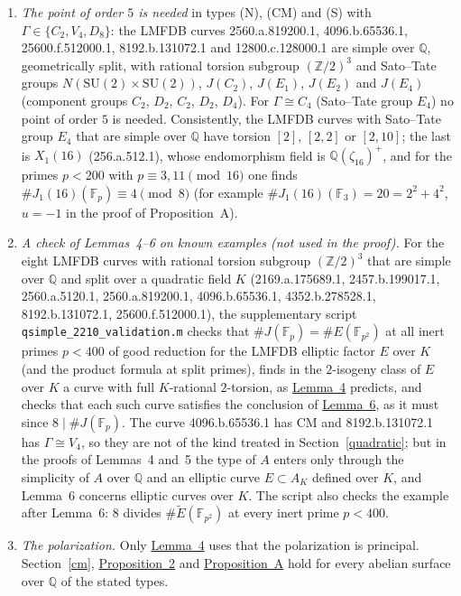 \documentclass[11pt]{article}
\newcommand{\Q}{\mathbb Q}
\newcommand{\Z}{\mathbb Z}
\newcommand{\F}{\mathbb F}
\begin{document}
\begin{enumerate}
\item \emph{The point of order \(5\) is needed} in types (N), (CM) and (S) with
\(\Gamma\in\{C_2,V_4,D_8\}\): the LMFDB curves 2560.a.819200.1, 4096.b.65536.1, 25600.f.512000.1,
8192.b.131072.1 and 12800.c.128000.1 are simple over \(\Q\), geometrically split, with rational
torsion subgroup \((\Z/2)^3\) and Sato--Tate groups \(N(\mathrm{SU}(2)\times\mathrm{SU}(2))\),
\(J(C_2)\), \(J(E_1)\), \(J(E_2)\) and \(J(E_4)\) (component groups \(C_2\), \(D_2\), \(C_2\),
\(D_2\), \(D_4\)). For \(\Gamma\cong C_4\) (Sato--Tate group \(E_4\)) no point of order \(5\) is
needed. Consistently, the LMFDB curves with Sato--Tate group \(E_4\) that are simple over \(\Q\)
have torsion \([2]\), \([2,2]\) or \([2,10]\); the last is \(X_1(16)\) (256.a.512.1), whose
endomorphism field is \(\Q(\zeta_{16})^+\), and for the primes \(p<200\) with \(p\equiv3,11
\pmod{16}\) one finds \(\#J_1(16)(\F_p)\equiv4\pmod8\) (for example \(\#J_1(16)(\F_3)=20=2^2+4^2\),
\(u=-1\) in the proof of Proposition~A).

\item \emph{A check of Lemmas~4--6 on known examples (not used in the proof).} For the eight
LMFDB curves with rational torsion subgroup \((\Z/2)^3\) that are simple over \(\Q\) and split
over a quadratic field \(K\) (2169.a.175689.1, 2457.b.199017.1, 2560.a.5120.1, 2560.a.819200.1,
4096.b.65536.1, 4352.b.278528.1, 8192.b.131072.1, 25600.f.512000.1), the supplementary script
\texttt{qsimple\_2210\_validation.m} checks that \(\#J(\F_p)=\#E(\F_{p^2})\) at all inert primes
\(p<400\) of good reduction for the LMFDB elliptic factor \(E\) over \(K\) (and the product formula
at split primes), finds in the \(2\)-isogeny class of \(E\) over \(K\) a curve with full
\(K\)-rational \(2\)-torsion, as \hyperref[lemma-full]{Lemma~4} predicts, and checks that each such
curve satisfies the conclusion of \hyperref[lemma-cheb]{Lemma~6}, as it must since
\(8\mid\#J(\F_p)\). The curve 4096.b.65536.1 has CM and 8192.b.131072.1 has \(\Gamma\cong V_4\),
so they are not of the kind treated in Section~\ref{quadratic}; but in the proofs of Lemmas~4
and~5 the type of \(A\) enters only through the simplicity of \(A\) over \(\Q\) and an elliptic
curve \(E\subset A_K\) defined over \(K\), and Lemma~6 concerns elliptic curves over \(K\). The script also checks the example
after Lemma~6: \(8\) divides \(\#\widetilde E(\F_{p^2})\) at every inert prime \(p<400\).

\item \emph{The polarization.} Only \hyperref[lemma-full]{Lemma~4} uses that the polarization is
principal. Section~\ref{cm}, \hyperref[prop-gamma]{Proposition~2} and
\hyperref[prop-A]{Proposition~A} hold for every abelian surface over \(\Q\) of the stated types.


\end{enumerate}
\end{document}
